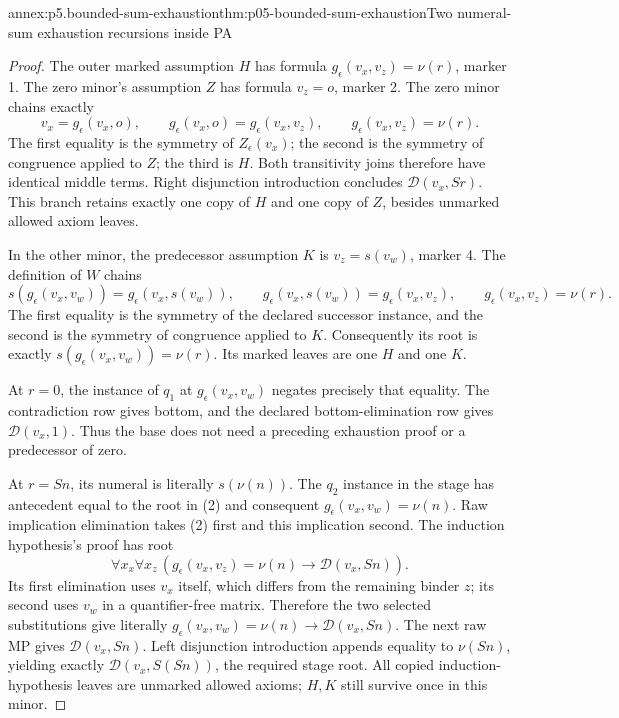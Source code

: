 \begin{annexitem}{annex:p5.bounded-sum-exhaustion}{thm:p05-bounded-sum-exhaustion}{Two numeral-sum exhaustion recursions inside PA}
\begin{proof}
The outer marked assumption \(H\) has formula
\(g_\epsilon(v_x,v_z)=\nu(r)\), marker 1. The zero minor's
assumption \(Z\) has formula \(v_z=o\), marker 2. The zero minor
chains exactly
\[
 v_x=g_\epsilon(v_x,o),\qquad
 g_\epsilon(v_x,o)=g_\epsilon(v_x,v_z),\qquad
 g_\epsilon(v_x,v_z)=\nu(r).
\tag{1}
\]
The first equality is the symmetry of \(Z_\epsilon(v_x)\); the
second is the symmetry of congruence applied to \(Z\); the third is
\(H\). Both transitivity joins therefore have identical middle terms.
Right disjunction introduction concludes \(\mathcal D(v_x,Sr)\).
This branch retains exactly one copy of \(H\) and one copy of \(Z\),
besides unmarked allowed axiom leaves.

In the other minor, the predecessor assumption \(K\) is
\(v_z=s(v_w)\), marker 4. The definition of \(W\) chains
\[
 s(g_\epsilon(v_x,v_w))=g_\epsilon(v_x,s(v_w)),\qquad
 g_\epsilon(v_x,s(v_w))=g_\epsilon(v_x,v_z),\qquad
 g_\epsilon(v_x,v_z)=\nu(r).
\tag{2}
\]
The first equality is the symmetry of the declared successor instance,
and the second is the symmetry of congruence applied to \(K\).
Consequently its root is exactly
\(s(g_\epsilon(v_x,v_w))=\nu(r)\). Its marked leaves are one
\(H\) and one \(K\).

At \(r=0\), the instance of \(q_1\) at
\(g_\epsilon(v_x,v_w)\) negates precisely that equality. The
contradiction row gives bottom, and the declared bottom-elimination row
gives \(\mathcal D(v_x,1)\). Thus the base does not need a preceding
exhaustion proof or a predecessor of zero.

At \(r=Sn\), its numeral is literally \(s(\nu(n))\). The
\(q_2\) instance in the stage has antecedent equal to the root in
(2) and consequent
\(g_\epsilon(v_x,v_w)=\nu(n)\). Raw implication elimination takes
(2) first and this implication second. The induction hypothesis's proof
has root
\[
 \forall x_x\forall x_z\,
       (g_\epsilon(v_x,v_z)=\nu(n)\to\mathcal D(v_x,Sn)).
\]
Its first elimination uses \(v_x\) itself, which differs from the
remaining binder \(z\); its second uses \(v_w\) in a
quantifier-free matrix. Therefore the two selected substitutions give
literally
\(g_\epsilon(v_x,v_w)=\nu(n)\to\mathcal D(v_x,Sn)\).
The next raw MP gives \(\mathcal D(v_x,Sn)\). Left disjunction
introduction appends equality to \(\nu(Sn)\), yielding exactly
\(\mathcal D(v_x,S(Sn))\), the required stage root. All copied
induction-hypothesis leaves are unmarked allowed axioms; \(H,K\)
still survive once in this minor.


\end{proof}
\end{annexitem}
